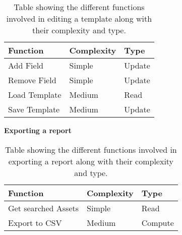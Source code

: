 \begin{table}[H]
\centering
    \begin{tabular}{|l|l|l|}
        \hline
        \textbf{Function} & \textbf{Complexity} & \textbf{Type} \\
        \hline
        \hline
        Add Field & Simple & Update\\
        \hline
        Remove Field & Simple & Update\\
        \hline
        Load Template & Medium & Read\\
        \hline
        Save Template & Medium & Update\\
        \hline
        
    \end{tabular}
\caption{Table showing the different functions involved in editing a template along with their complexity and type.}\label{tab:EditTemplateFunctions}
\end{table}

\par

\begin{center}
    \textbf{Exporting a report}
\end{center}

\begin{table}[H]
\centering
    \begin{tabular}{|l|l|l|}
        \hline
        \textbf{Function} & \textbf{Complexity} & \textbf{Type} \\
        \hline
        \hline
        Get searched Assets & Simple & Read\\
        \hline
        Export to CSV & Medium & Compute\\
        \hline
        
    \end{tabular}
\caption{Table showing the different functions involved in exporting a report along with their complexity and type.}\label{tab:ExportReportFunctions}
\end{table}